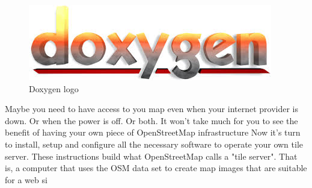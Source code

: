 \newpage
\begin{figure}[ht]

\centering \includegraphics[scale=1]{input/images/doxygen.jpeg}
\caption{Doxygen logo}
\end{figure}
\noindent Maybe you need to have access to you map even when your internet provider is down. Or when the power is off. Or both. It won’t take much for you to see the benefit of having your own piece of OpenStreetMap infrastructure
Now it’s turn to install, setup and configure all the necessary software to operate your own tile server.
These instructions build what OpenStreetMap calls a "tile server". That is, a computer that uses the OSM data set to create map images that are suitable for a web si
 
